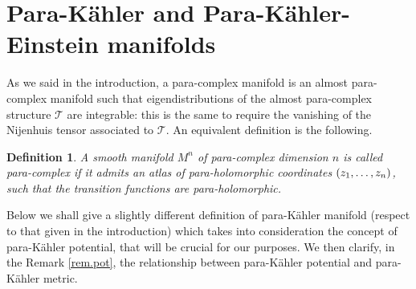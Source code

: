 \documentclass[11pt, reqno]{amsart}
\newtheorem{df}[theor]{Definition}
\newcommand{\K }{K\"{a}hler }
\newcommand{\KE }{K\"{a}hler-Einstein }
\newcommand{\pk }{para-K\"{a}hler }
\begin{document}
\section{Para-\K and Para-\KE  manifolds}\label{sec.pk.diastasis}


As we said in the introduction, a para-complex manifold is an almost para-complex manifold such that eigendistributions of the almost para-complex structure $\mathcal{T}$ are integrable: this is the same to require the vanishing of the Nijenhuis tensor associated to $\mathcal{T}$. An equivalent definition is the following.
%
\begin{df}
A smooth manifold $M^n$ of para-complex dimension $n$ is called \emph{para-complex} if it admits an atlas of para-holomorphic coordinates $(z_1,\mathellipsis,z_n)$, such that the transition functions are para-holomorphic.
\end{df}


Below we shall give a slightly different definition of \pk manifold (respect to that given in the introduction) which takes into consideration the concept of \pk potential, that will be crucial for our purposes. We then clarify, in the Remark \ref{rem.pot}, the relationship between \pk potential and \pk metric.
\end{document}

